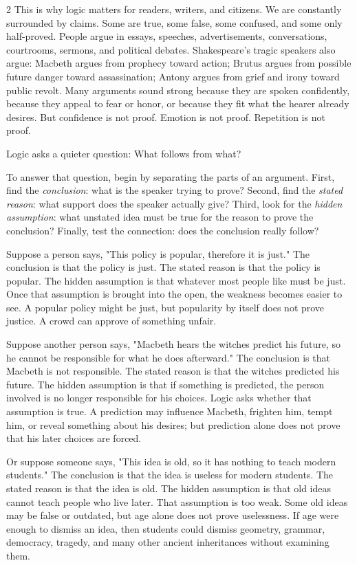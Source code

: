 \documentclass[12pt]{article}
\begin{document}
\begin{multicols}{2}
This is why logic matters for readers, writers, and citizens. We are constantly surrounded by claims. Some are true, some false, some confused, and some only half-proved. People argue in essays, speeches, advertisements, conversations, courtrooms, sermons, and political debates. Shakespeare's tragic speakers also argue: Macbeth argues from prophecy toward action; Brutus argues from possible future danger toward assassination; Antony argues from grief and irony toward public revolt. Many arguments sound strong because they are spoken confidently, because they appeal to fear or honor, or because they fit what the hearer already desires. But confidence is not proof. Emotion is not proof. Repetition is not proof.

Logic asks a quieter question: What follows from what?

To answer that question, begin by separating the parts of an argument. First, find the \textit{conclusion}: what is the speaker trying to prove? Second, find the \textit{stated reason}: what support does the speaker actually give? Third, look for the \textit{hidden assumption}: what unstated idea must be true for the reason to prove the conclusion? Finally, test the connection: does the conclusion really follow?

Suppose a person says, "This policy is popular, therefore it is just." The conclusion is that the policy is just. The stated reason is that the policy is popular. The hidden assumption is that whatever most people like must be just. Once that assumption is brought into the open, the weakness becomes easier to see. A popular policy might be just, but popularity by itself does not prove justice. A crowd can approve of something unfair.

Suppose another person says, "Macbeth hears the witches predict his future, so he cannot be responsible for what he does afterward." The conclusion is that Macbeth is not responsible. The stated reason is that the witches predicted his future. The hidden assumption is that if something is predicted, the person involved is no longer responsible for his choices. Logic asks whether that assumption is true. A prediction may influence Macbeth, frighten him, tempt him, or reveal something about his desires; but prediction alone does not prove that his later choices are forced.

Or suppose someone says, "This idea is old, so it has nothing to teach modern students." The conclusion is that the idea is useless for modern students. The stated reason is that the idea is old. The hidden assumption is that old ideas cannot teach people who live later. That assumption is too weak. Some old ideas may be false or outdated, but age alone does not prove uselessness. If age were enough to dismiss an idea, then students could dismiss geometry, grammar, democracy, tragedy, and many other ancient inheritances without examining them.


\end{multicols}
\end{document}
